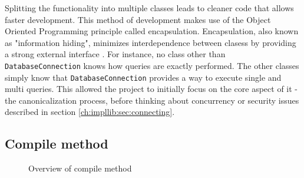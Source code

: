 Splitting the functionality into multiple classes leads to cleaner code that allows faster development. This method of development makes use of the Object Oriented Programming principle called encapsulation. Encapsulation, also known as "information hiding", minimizes interdependence between clasess by providing a strong external interface \citep{Encapsulation}. For instance, no class other than \texttt{DatabaseConnection} knows how queries are exactly performed. The other classes simply know that \texttt{DatabaseConnection} provides a way to execute single and multi queries. This allowed the project to initially focus on the core aspect of it - the canonicalization process, before thinking about concurrency or security issues described in section \ref{ch:impllib:sec:connecting}.

\subsection{Compile method}
\begin{figure}[H]
\caption{Overview of compile method}
\end{figure}

